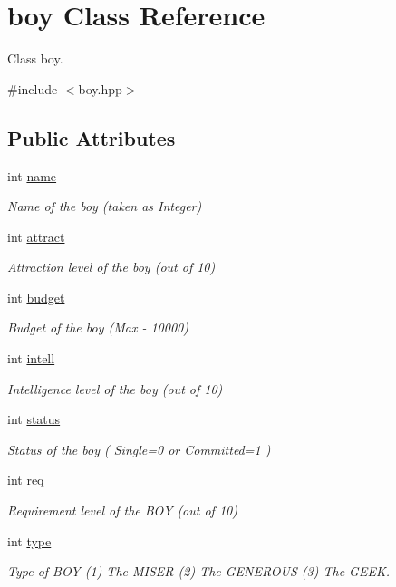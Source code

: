 \hypertarget{classboy}{\section{boy Class Reference}
\label{classboy}
}


Class boy.  




{\ttfamily \#include $<$boy.\-hpp$>$}

\subsection*{Public Attributes}
\begin{DoxyCompactItemize}
\item 
int \hyperlink{classboy_a28a1e04736fbd9fc28237298b411e7d1}{name}
\begin{DoxyCompactList}\small\item\em Name of the boy (taken as Integer) \end{DoxyCompactList}\item 
int \hyperlink{classboy_ad89bd35b80537ce982b6408703cbf9e7}{attract}
\begin{DoxyCompactList}\small\item\em Attraction level of the boy (out of 10) \end{DoxyCompactList}\item 
int \hyperlink{classboy_a80d6bd6642a612cf0428ab56a2098316}{budget}
\begin{DoxyCompactList}\small\item\em Budget of the boy (Max -\/ 10000) \end{DoxyCompactList}\item 
int \hyperlink{classboy_acc48a9f5c15cae36d7319b22057efdcf}{intell}
\begin{DoxyCompactList}\small\item\em Intelligence level of the boy (out of 10) \end{DoxyCompactList}\item 
int \hyperlink{classboy_a9cefa4f67f3e53439a6baa96628a9a8a}{status}
\begin{DoxyCompactList}\small\item\em Status of the boy ( Single=0 or Committed=1 ) \end{DoxyCompactList}\item 
int \hyperlink{classboy_a9e6ba507f2c7fccefacfb904e8526241}{req}
\begin{DoxyCompactList}\small\item\em Requirement level of the B\-O\-Y (out of 10) \end{DoxyCompactList}\item 
int \hyperlink{classboy_a53f19b290e6f6930623ca571a7d38e18}{type}
\begin{DoxyCompactList}\small\item\em Type of B\-O\-Y (1) The M\-I\-S\-E\-R (2) The G\-E\-N\-E\-R\-O\-U\-S (3) The G\-E\-E\-K. \end{DoxyCompactList}\end{DoxyCompactItemize}


